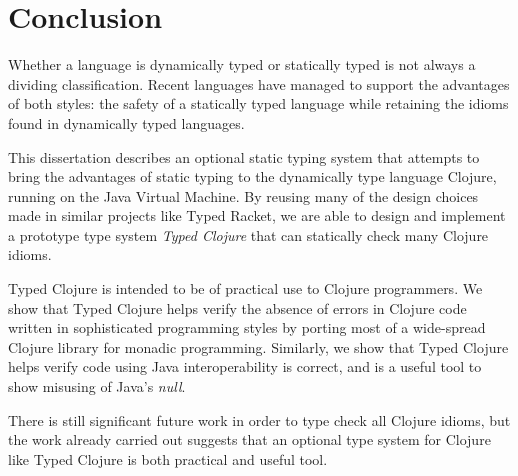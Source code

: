 \documentclass{cshonours}
\begin{document}
\tableofcontents













\chapter{Conclusion}

Whether a language is dynamically typed or statically typed is not always a
dividing classification. Recent languages have managed to support the advantages of both styles:
the safety of a statically typed language while retaining the idioms found in
dynamically typed languages.

This dissertation describes an optional static typing system
that attempts to bring the advantages of static typing to the dynamically type language
Clojure, running on the Java Virtual Machine. 
By reusing many of the design choices made in similar projects
like Typed Racket, we are able to design and implement a prototype type system
\emph{Typed Clojure} that can statically check many Clojure idioms.

Typed Clojure is intended to be of practical use to Clojure programmers.
We show that Typed Clojure helps verify the absence of errors in Clojure code written in sophisticated
programming styles by porting most of a wide-spread Clojure library for monadic programming.
Similarly, we show that Typed Clojure helps verify code using Java interoperability is correct, and is
a useful tool to show misusing of Java's \emph{null}.

There is still significant future work in order to type check all Clojure idioms,
but the work already carried out suggests that an optional type system for Clojure
like Typed Clojure is both practical and useful tool.

\printbibliography[title=References]


\end{document}
